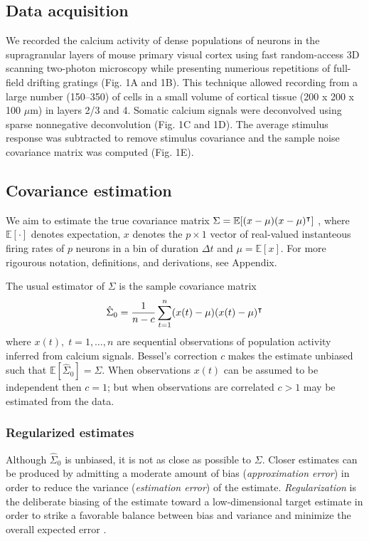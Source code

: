 \subsection*{Data acquisition}
We recorded the calcium activity  of dense populations of neurons in the supragranular layers of mouse primary visual cortex using fast random-access 3D scanning two-photon microscopy \cite{Stosiek:2003,Reddy:2005}   while presenting numerious repetitions of full-field drifting gratings (Fig. 1A and 1B). This technique allowed recording from a large number (150--350) of cells in a small volume of cortical tissue (200 x 200 x 100 $\mu$m) in layers 2/3 and 4. Somatic calcium signals were deconvolved using  sparse nonnegative deconvolution \cite{Vogelstein:2010} (Fig. 1C and 1D).  The average stimulus response was subtracted to remove stimulus covariance and the sample noise covariance matrix was computed (Fig. 1E).

\subsection*{Covariance estimation}
We aim to estimate the true covariance matrix $\Sigma = \mathbb E [(x-\mu)(x-\mu)^\intercal]$ , where $\mathbb E[\cdot]$ denotes expectation, $x$ denotes the $p\times 1$ vector of real-valued instanteous firing rates of $p$ neurons in a bin of duration $\Delta t$ and $\mu = \mathbb E[x]$.  For more rigourous notation, definitions, and derivations, see Appendix. 

The usual estimator of $\Sigma$ is the sample covariance matrix
\begin{equation}
\hat \Sigma_0 = \frac 1 {n-c} \sum\limits_{t=1}^n (x(t)-\mu)(x(t)-\mu)^\intercal 
\end{equation}
where $x(t),\;t=1,\ldots,n$ are sequential observations of population activity inferred from calcium signals. Bessel's correction $c$ makes the estimate unbiased such that $\mathbb E[\hat\Sigma_0] = \Sigma$. When observations $x(t)$ can be assumed to be independent then $c=1$; but when observations are correlated $c>1$ may be estimated from the data. 

\subsubsection*{Regularized estimates}
Although $\hat\Sigma_0$ is unbiased, it is not as close as possible to $\Sigma$.  Closer estimates can be produced by admitting a moderate amount of bias (\emph{approximation error}) in order to reduce the variance (\emph{estimation error}) of the estimate. 
\emph{Regularization} is the deliberate biasing of the estimate toward a low-dimensional target estimate in order to strike a favorable balance between bias and variance and minimize the overall expected error \cite{Bickel:2006,Ledoit:2004}.

